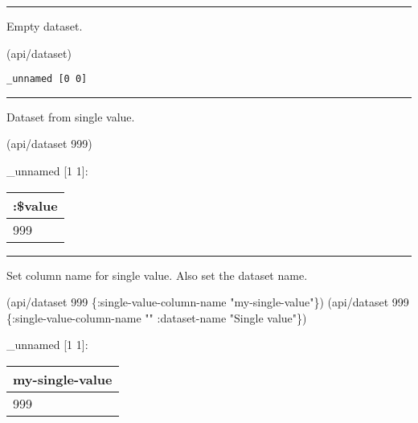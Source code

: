 \documentclass[]{article}
\newenvironment{Shaded}{\begin{snugshade}}{\end{snugshade}}
\newcommand{\AttributeTok}[1]{\textcolor[rgb]{0.77,0.63,0.00}{#1}}
\newcommand{\DecValTok}[1]{\textcolor[rgb]{0.00,0.00,0.81}{#1}}
\newcommand{\NormalTok}[1]{#1}
\newcommand{\StringTok}[1]{\textcolor[rgb]{0.31,0.60,0.02}{#1}}
\begin{document}
\begin{center}\rule{0.5\linewidth}{0.5pt}\end{center}

Empty dataset.

\begin{Shaded}
\begin{Highlighting}[]
\NormalTok{(api/dataset)}
\end{Highlighting}
\end{Shaded}

\begin{verbatim}
_unnamed [0 0]
\end{verbatim}

\begin{center}\rule{0.5\linewidth}{0.5pt}\end{center}

Dataset from single value.

\begin{Shaded}
\begin{Highlighting}[]
\NormalTok{(api/dataset }\DecValTok{999}\NormalTok{)}
\end{Highlighting}
\end{Shaded}

\_unnamed {[}1 1{]}:

\begin{longtable}[]{@{}l@{}}
\toprule
:\$value\tabularnewline
\midrule
\endhead
999\tabularnewline
\bottomrule
\end{longtable}

\begin{center}\rule{0.5\linewidth}{0.5pt}\end{center}

Set column name for single value. Also set the dataset name.

\begin{Shaded}
\begin{Highlighting}[]
\NormalTok{(api/dataset }\DecValTok{999}\NormalTok{ \{}\AttributeTok{:single-value-column-name} \StringTok{"my-single-value"}\NormalTok{\})}
\NormalTok{(api/dataset }\DecValTok{999}\NormalTok{ \{}\AttributeTok{:single-value-column-name} \StringTok{""}
                  \AttributeTok{:dataset-name} \StringTok{"Single value"}\NormalTok{\})}
\end{Highlighting}
\end{Shaded}

\_unnamed {[}1 1{]}:

\begin{longtable}[]{@{}l@{}}
\toprule
my-single-value\tabularnewline
\midrule
\endhead
999\tabularnewline
\bottomrule
\end{longtable}
\end{document}
